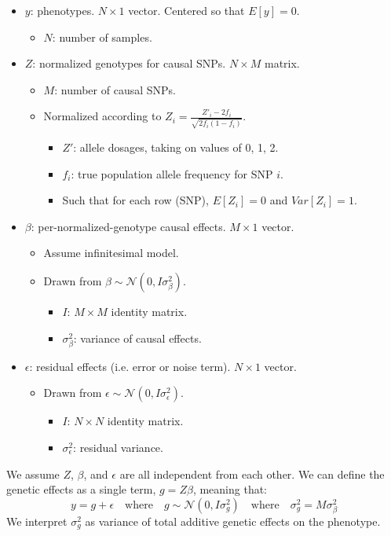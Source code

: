 \documentclass[12pt]{article}
\begin{document}
\begin{itemize}
    \item $y$: phenotypes.
    $N \times 1$ vector.
    Centered so that $E[y]=0$.
    \begin{itemize}
        \item $N$: number of samples.
    \end{itemize}
    \item $Z$: normalized genotypes for causal SNPs.
    $N \times M$ matrix.
    \begin{itemize}
        \item $M$: number of causal SNPs.
        \item Normalized according to
        $Z_i =  \frac{Z'_i - 2 f_i}{\sqrt{2 f_i (1 - f_i)}}$.
        \begin{itemize}
            \item $Z'$: allele dosages, taking on values of 0, 1, 2.
            \item $f_i$: true population allele frequency for SNP $i$.
            \item Such that for each row (SNP), $E[Z_i] = 0$ and $Var[Z_i] = 1$.
        \end{itemize}
    \end{itemize}
    \item $\beta$: per-normalized-genotype causal effects.
    $M \times 1$ vector.
    \begin{itemize}
        \item Assume infinitesimal model.
        \item Drawn from $\beta \sim \mathcal{N}(0, I \sigma_{\beta}^2)$.
        \begin{itemize}
            \item $I$: $M \times M$ identity matrix.
            \item $\sigma_{\beta}^2$: variance of causal effects.
        \end{itemize}
    \end{itemize}
    \item $\epsilon$: residual effects (i.e. error or noise term). $N \times 1$ vector.
    \begin{itemize}
        \item Drawn from $\epsilon \sim \mathcal{N}(0, I \sigma_{\epsilon}^2)$.
        \begin{itemize}
            \item $I$: $N \times N$ identity matrix.
            \item $\sigma_{\epsilon}^2$: residual variance.
        \end{itemize}
    \end{itemize}
\end{itemize}
We assume $Z$, $\beta$, and $\epsilon$ are all independent from each other.
We can define the genetic effects as a single term, $g = Z \beta$, meaning that:
\begin{equation*}
y = g + \epsilon
\quad\mathrm{where}\quad
g \sim \mathcal{N}(0, I \sigma_{g}^2)
\quad\mathrm{where}\quad
\sigma_{g}^2 = M \sigma_{\beta}^2
\end{equation*}
We interpret $\sigma_{g}^2$ as variance of total additive genetic effects on the phenotype.
\end{document}
